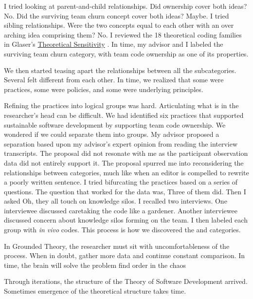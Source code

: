 I tried looking at parent-and-child relationships. Did ownership cover both ideas? No. Did the surviving team churn concept cover both ideas? Maybe. I tried sibling relationships. Were the two concepts equal to each other with an over arching idea comprising them?  No. I reviewed the 18 theoretical coding families in Glaser’s \underline{Theoretical Sensitivity} \cite{GlaserTheoreticalSensitivity}. In time, my advisor and I labeled the surviving team churn category,  with team code ownership as one of its properties. 

We then started teasing apart the relationships between all the subcategories. Several felt different from each other. In time, we realized that some were practices, some were policies, and some were underlying principles. 

Refining the practices into logical groups was hard. Articulating what is in the researcher’s head can be difficult. We had identified six practices that supported sustainable software development by supporting team code ownership. We wondered if we could separate them into groups. My advisor proposed a separation based upon my advisor’s expert opinion from reading the interview transcripts. The proposal did not resonate with me as the participant observation data did not entirely support it. The proposal spurred me into reconsidering the relationships between categories, much like when an editor is compelled to rewrite a poorly written sentence. I tried bifurcating the practices based on a series of questions. The question that worked for the data was,  Three of them did. Then I asked  Oh, they all touch on knowledge silos. I recalled two interviews. One interviewee discussed caretaking the code like a gardener. Another interviewee discussed concern about knowledge silos forming on the team. I then labeled each group with \textit{in vivo} codes. This process is how we discovered the  and  categories. 

In Grounded Theory, the researcher must sit with uncomfortableness of the process. When in doubt, gather more data and continue constant comparison. In time, the brain will solve the problem find order in the chaos 

Through iterations, the structure of the Theory of Software Development arrived. Sometimes emergence of the theoretical structure takes time.

